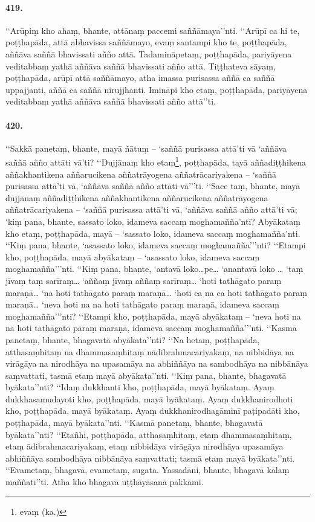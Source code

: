 \paragraph{419.} ‘‘Arūpiṃ kho ahaṃ, bhante, attānaṃ paccemi saññāmaya’’nti. ‘‘Arūpī ca hi te, poṭṭhapāda, attā abhavissa saññāmayo, evaṃ santampi kho te, poṭṭhapāda, aññāva saññā bhavissati añño attā. Tadamināpetaṃ, poṭṭhapāda, pariyāyena veditabbaṃ yathā aññāva saññā bhavissati añño attā. Tiṭṭhateva sāyaṃ, poṭṭhapāda, arūpī attā saññāmayo, atha imassa purisassa aññā ca saññā uppajjanti, aññā ca saññā nirujjhanti. Imināpi kho etaṃ, poṭṭhapāda, pariyāyena veditabbaṃ yathā aññāva saññā bhavissati añño attā’’ti.

\paragraph{420.} ‘‘Sakkā panetaṃ, bhante, mayā ñātuṃ – ‘saññā purisassa attā’ti vā ‘aññāva saññā añño attāti vā’ti? ‘‘Dujjānaṃ kho etaṃ\footnote{evaṃ (ka.)}, poṭṭhapāda, tayā aññadiṭṭhikena aññakhantikena aññarucikena aññatrāyogena aññatrācariyakena – ‘saññā purisassa attā’ti vā, ‘aññāva saññā añño attāti vā’’’ti. ‘‘Sace taṃ, bhante, mayā dujjānaṃ aññadiṭṭhikena aññakhantikena aññarucikena aññatrāyogena aññatrācariyakena – ‘saññā purisassa attā’ti vā, ‘aññāva saññā añño attā’ti vā; ‘kiṃ pana, bhante, sassato loko, idameva saccaṃ moghamañña’nti? Abyākataṃ kho etaṃ, poṭṭhapāda, mayā – ‘sassato loko, idameva saccaṃ moghamañña’nti. ‘‘Kiṃ pana, bhante, ‘asassato loko, idameva saccaṃ moghamañña’’’nti? ‘‘Etampi kho, poṭṭhapāda, mayā abyākataṃ – ‘asassato loko, idameva saccaṃ moghamañña’’’nti. ‘‘Kiṃ pana, bhante, ‘antavā loko…pe… ‘anantavā loko … ‘taṃ jīvaṃ taṃ sarīraṃ… ‘aññaṃ jīvaṃ aññaṃ sarīraṃ… ‘hoti tathāgato paraṃ maraṇā… ‘na hoti tathāgato paraṃ maraṇā… ‘hoti ca na ca hoti tathāgato paraṃ maraṇā… ‘neva hoti na na hoti tathāgato paraṃ maraṇā, idameva saccaṃ moghamañña’’’nti? ‘‘Etampi kho, poṭṭhapāda, mayā abyākataṃ – ‘neva hoti na na hoti tathāgato paraṃ maraṇā, idameva saccaṃ moghamañña’’’nti. ‘‘Kasmā panetaṃ, bhante, bhagavatā abyākata’’nti? ‘‘Na hetaṃ, poṭṭhapāda, atthasaṃhitaṃ na dhammasaṃhitaṃ nādibrahmacariyakaṃ, na nibbidāya na virāgāya na nirodhāya na upasamāya na abhiññāya na sambodhāya na nibbānāya saṃvattati, tasmā etaṃ mayā abyākata’’nti. ‘‘Kiṃ pana, bhante, bhagavatā byākata’’nti? ‘‘Idaṃ dukkhanti kho, poṭṭhapāda, mayā byākataṃ. Ayaṃ dukkhasamudayoti kho, poṭṭhapāda, mayā byākataṃ. Ayaṃ dukkhanirodhoti kho, poṭṭhapāda, mayā byākataṃ. Ayaṃ dukkhanirodhagāminī paṭipadāti kho, poṭṭhapāda, mayā byākata’’nti. ‘‘Kasmā panetaṃ, bhante, bhagavatā byākata’’nti? ‘‘Etañhi, poṭṭhapāda, atthasaṃhitaṃ, etaṃ dhammasaṃhitaṃ, etaṃ ādibrahmacariyakaṃ, etaṃ nibbidāya virāgāya nirodhāya upasamāya abhiññāya sambodhāya nibbānāya saṃvattati; tasmā etaṃ mayā byākata’’nti. ‘‘Evametaṃ, bhagavā, evametaṃ, sugata. Yassadāni, bhante, bhagavā kālaṃ maññatī’’ti. Atha kho bhagavā uṭṭhāyāsanā pakkāmi.

